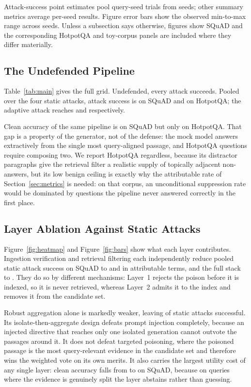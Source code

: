 Attack-success point estimates pool query-seed trials from \nSeeds{} seeds; other summary
metrics average per-seed results. Figure error bars show the observed min-to-max range across
seeds. Unless a subsection says otherwise, figures show SQuAD and the corresponding
HotpotQA and toy-corpus panels are included where they differ materially.

\subsection{The Undefended Pipeline}

Table~\ref{tab:main} gives the full grid. Undefended, every attack succeeds. Pooled over the
four static attacks, attack success is \asrStaticSquadnone{} on SQuAD and
\asrStaticHotpotqanone{} on HotpotQA; the adaptive attack reaches \asrAdaptiveSquadnone{} and
\asrAdaptiveHotpotqanone{} respectively.

Clean accuracy of the same pipeline is \cleanAccSquadnone{} on SQuAD but only
\cleanAccHotpotqanone{} on HotpotQA. That gap is a property of the generator, not of the
defense: the mock model answers extractively from the single most query-aligned passage, and
HotpotQA questions require composing two. We report HotpotQA regardless, because its distractor
paragraphs give the retrieval filter a realistic supply of topically adjacent non-answers, but
its low benign ceiling is exactly why the attributable rate of Section~\ref{sec:metrics} is
needed: on that corpus, an unconditional suppression rate would be dominated by questions the
pipeline never answered correctly in the first place.



\subsection{Layer Ablation Against Static Attacks}

Figure~\ref{fig:heatmap} and Figure~\ref{fig:bars} show what each layer contributes.
Ingestion verification and retrieval filtering each independently reduce pooled static attack
success on SQuAD to \casrStaticSquadLOne{} and \casrStaticSquadLTwo{} in attributable terms, and
the full stack to \casrStaticSquadfull{}. They do so by different mechanisms: Layer~1 rejects
the poison before it is indexed, so it is never retrieved, whereas Layer~2 admits it to the
index and removes it from the candidate set.

Robust aggregation alone is markedly weaker, leaving \casrStaticSquadLThree{} of static attacks
successful. Its isolate-then-aggregate design defeats prompt injection completely, because an
injected directive that reaches only one isolated generation cannot outvote the passages around
it. It does not defeat targeted poisoning, where the poisoned passage is the most query-relevant
evidence in the candidate set and therefore wins the weighted vote on its own merits. It also
carries the largest utility cost of any single layer: clean accuracy falls from
\cleanAccSquadnone{} to \cleanAccSquadLThree{} on SQuAD, because on queries where the evidence is
genuinely split the layer abstains rather than guessing.

